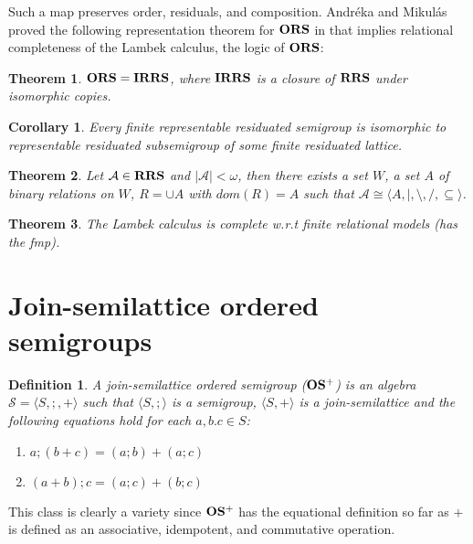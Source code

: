 \documentclass[a4paper]{article}
\theoremstyle{defin}
\newtheorem{defin}{Definition}
\theoremstyle{theorem}
\newtheorem{theorem}{Theorem}
\theoremstyle{prop}
\theoremstyle{lemma}
\theoremstyle{ex}
\theoremstyle{col}
\newtheorem{col}{Corollary}
\begin{document}
Such a map preserves order, residuals, and composition. Andr\'{e}ka and Mikul\'{a}s proved the following representation theorem for ${\bf ORS}$ in \cite{andreka1994lambek} that implies relational completeness of the Lambek calculus, the logic of ${\bf ORS}$:

\begin{theorem}\label{ors=irrs}
  ${\bf ORS} = {\bf IRRS}$, where ${\bf IRRS}$ is a closure of ${\bf RRS}$ under isomorphic copies.
\end{theorem}

\begin{col}
  Every finite representable residuated semigroup is isomorphic to representable residuated subsemigroup of some finite residuated lattice.
\end{col}

\begin{theorem}
  Let $\mathcal{A} \in {\bf RRS}$ and $|\mathcal{A}| < \omega$, then there exists a set $W$, a set $A$ of binary relations on $W$, $R = \cup A$ with $dom(R) = A$ such that
  $\mathcal{A} \cong \langle A, |, \setminus, /, \subseteq \rangle$.
\end{theorem}

\begin{theorem}
  The Lambek calculus is complete w.r.t finite relational models (has the fmp).
\end{theorem}


\section{Join-semilattice ordered semigroups}

\begin{defin} A join-semilattice ordered semigroup (${\bf OS^{+}}$) is an algebra $\mathcal{S} = \langle S, ;, + \rangle$ such that $\langle S, ; \rangle$ is a semigroup, $\langle S, + \rangle$ is a join-semilattice and the following equations hold for each $a, b. c \in S$:

  \begin{enumerate}
    \item $a ; (b + c) = (a ; b) + (a ; c)$
    \item $(a + b) ; c = (a ; c) + (b ; c)$
  \end{enumerate}
\end{defin}
This class is clearly a variety since ${\bf OS^{+}}$ has the equational definition so far as $+$ is defined as an associative, idempotent, and commutative operation.
\end{document}
